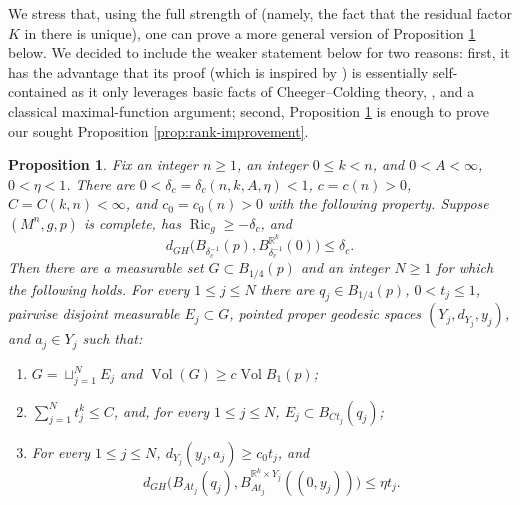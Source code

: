 \documentclass[11pt]{amsart}
\newtheorem{proposition}[theorem]{Proposition}
\theoremstyle{definition}
\theoremstyle{remark}
\DeclareMathOperator{\Ric}{Ric}
\DeclareMathOperator{\Vol}{Vol}
\newcommand{\R}{\mathbb R}
\begin{document}
We stress that, using the full strength of \cite[Theorem 5.1]{KapovitchWilking} (namely, the fact that the residual factor $K$ in there is unique), one can prove a more general version of Proposition \ref{prop:critical-package} below. We decided to include the weaker statement below for two reasons: first, it has the advantage that its proof (which is inspired by \cite{KapovitchWilking, Jansen}) is essentially self-contained as it only leverages basic facts of Cheeger--Colding theory, \cite[Lemma 2.1]{KapovitchWilking}, and a classical maximal-function argument; second, Proposition \ref{prop:critical-package} is enough to prove our sought Proposition \ref{prop:rank-improvement}.
\begin{proposition}
\label{prop:critical-package}
Fix an integer $n\geq 1$, an integer $0\leq k<n$, and $0<A<\infty$, $0<\eta<1$.
There are $0<\delta_c=\delta_c(n,k,A,\eta)<1$,
$c=c(n)>0$, $C=C(k,n)<\infty$, and $c_0=c_0(n)>0$ with the following
property.  Suppose $(M^n,g,p)$ is complete, has $\Ric_g\geq -\delta_c$, and
\[
 d_{GH}\bigl(B_{\delta_c^{-1}}(p),
             B_{\delta_c^{-1}}^{\R^k}(0)\bigr)\leq\delta_c.
\]
Then there are a measurable set $G\subset B_{1/4}(p)$ and an integer $N\geq 1$ for which the following holds. For every $1\leq j\leq N$ there are $q_j\in B_{1/4}(p)$, $0<t_j\leq 1$, pairwise disjoint measurable $E_j\subset G$, pointed proper geodesic spaces $(Y_j,d_{Y_j},y_j)$, and $a_j\in Y_j$ such that:
\begin{enumerate}[label=\textup{(\roman*)},leftmargin=2.3em]
\item $G=\sqcup_{j=1}^N E_j$ and $\Vol(G)\geq c\Vol B_1(p)$;
\item $\sum_{j=1}^N t_j^k\leq C$, and, for every $1\leq j\leq N$, $E_j\subset B_{Ct_j}(q_j)$;
\item For every $1\leq j\leq N$, $d_{Y_j}(y_j,a_j)\geq c_0t_j$, and
\[
 d_{GH}\bigl(B_{At_j}(q_j),
             B_{At_j}^{\mathbb R^k\times Y_j}((0,y_j))\bigr)\leq\eta t_j.
\]
\end{enumerate}
\end{proposition}
\end{document}
